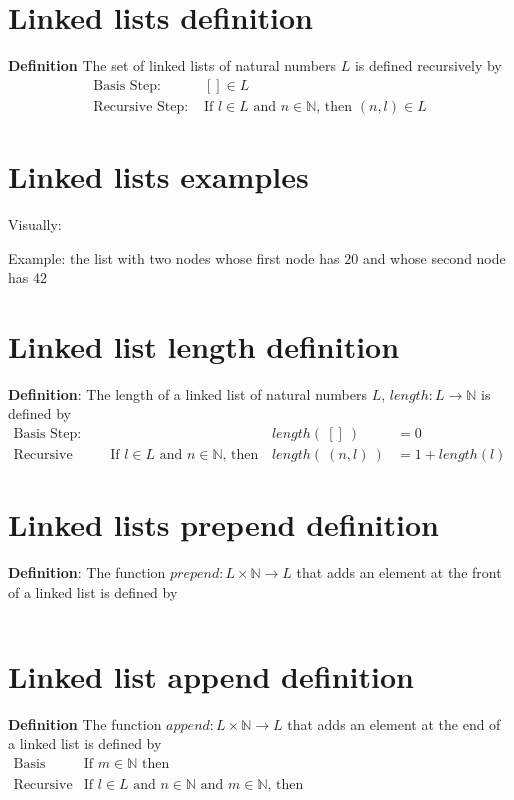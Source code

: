 \documentclass[12pt, oneside]{article}
\begin{document}
\section*{Linked lists definition}


{\bf Definition} The set of linked lists of natural numbers $L$ is defined recursively by
\[
\begin{array}{ll}
    \textrm{Basis Step: } & [] \in L \\
    \textrm{Recursive Step: } & \textrm{If } l \in L\textrm{ and }n \in \mathbb{N} \textrm{, then } (n, l) \in L
\end{array}
\] \vfill
\section*{Linked lists examples}


Visually:

\vspace{50pt}

Example: the list with two nodes whose first node has $20$ and whose second node
has $42$

\vspace{50pt} \vfill
\section*{Linked list length definition}


{\bf Definition}: The length of a linked list of natural numbers $L$, $length: L \to \mathbb{N}$ is defined by
\[
\begin{array}{llll}
\textrm{Basis Step:} &  & length(~[]~) &= 0 \\
\textrm{Recursive Step:} & \textrm{If } l \in L\textrm{ and }n \in \mathbb{N}\textrm{, then  } & length(~(n, l)~)  &= 1+ length(l)
\end{array}
\]
 \vfill
\section*{Linked lists prepend definition}


{\bf Definition}: The function $prepend : L \times \mathbb{N} \to L$ that adds an element at the 
front of a linked list is defined by
\[
\phantom{prepend(~(l, n)~) = (n, l)}
\]
 \vfill
\section*{Linked list append definition}


{\bf Definition} The function $append : L \times \mathbb{N} \to L$ that 
adds an element at the end of a linked list is defined by
\[
\begin{array}{llll}
\textrm{Basis Step:} & \textrm{If } m \in \mathbb{N}\textrm{ then } & \phantom{append(~([], m)~)} & \phantom{= (m, []) }\\
\textrm{Recursive Step:} & \textrm{If } l \in L\textrm{ and }n \in \mathbb{N}\textrm{ and }m \in \mathbb{N}\textrm{, then  } & \phantom{append(~(~(n, l), m~)~) } &\phantom{= (n, append(~(l, m)~)~)}
\end{array}
\] \vfill
\end{document}
